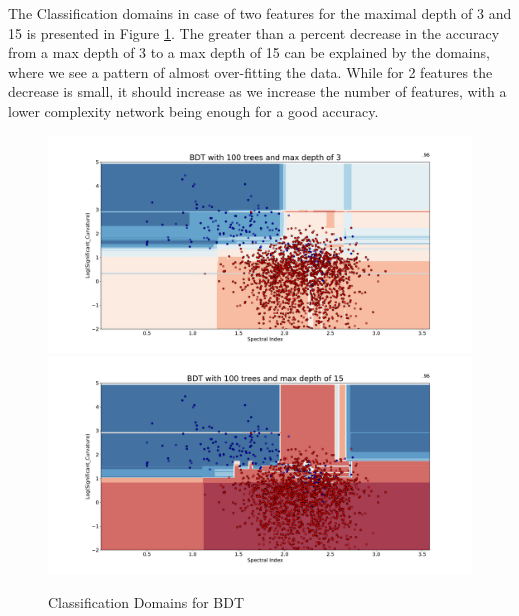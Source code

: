 The Classification domains in case of two features for the maximal depth of 3 and 15 is presented in Figure \ref{fig:BDT_domains}. The greater than a percent decrease in the accuracy from a max depth of 3 to a max depth of 15 can be explained by the domains, where we see a pattern of almost over-fitting the data. While for 2 features the decrease is small, it should increase as we increase the number of features, with a lower complexity network being enough for a good accuracy.

\begin{figure}[h]
\includegraphics[width=\twopicsp\textwidth]{plots/classdom_bdt_100_3.pdf}
\includegraphics[width=\twopicsp\textwidth]{plots/classdom_bdt_100_15.pdf}
\caption{Classification Domains for BDT}
\label{fig:BDT_domains}
\end{figure}


